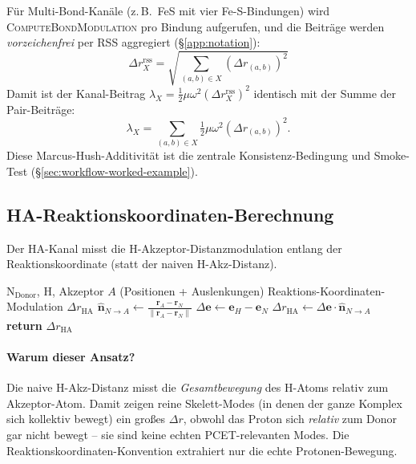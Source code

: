 \documentclass[11pt,a4paper,twoside]{article}
\theoremstyle{remark}
\begin{document}
F\"ur Multi-Bond-Kan\"ale (z.\,B.\ FeS mit vier Fe-S-Bindungen) wird
\textsc{ComputeBondModulation} pro Bindung aufgerufen, und die
Beitr\"age werden \emph{vorzeichenfrei} per RSS aggregiert
(\S\ref{app:notation}):
\begin{equation}
  \Delta r_X^\text{rss} = \sqrt{\sum_{(a,b) \in X} (\Delta r_{(a,b)})^2}
\end{equation}
Damit ist der Kanal-Beitrag $\lambda_X = \tfrac{1}{2}\mu\omega^2
(\Delta r_X^\text{rss})^2$ identisch mit der Summe der
Pair-Beitr\"age:
\begin{equation}
  \lambda_X = \sum_{(a,b) \in X} \tfrac{1}{2}\mu\omega^2 (\Delta r_{(a,b)})^2.
  \label{eq:reorg-additivity}
\end{equation}
Diese Marcus-Hush-Additivit\"at ist die zentrale Konsistenz-Bedingung
und Smoke-Test (\S\ref{sec:workflow-worked-example}).

\subsection{HA-Reaktionskoordinaten-Berechnung}
\label{app:pseudo-ha}

Der HA-Kanal misst die H-Akzeptor-Distanzmodulation entlang der
Reaktionskoordinate (statt der naiven H-Akz-Distanz).

\begin{algorithm}[H]
\caption{\textsc{ComputeHAReactionCoord}}
\begin{algorithmic}[1]
\Require N$_\text{Donor}$, H, Akzeptor $A$ (Positionen + Auslenkungen)
\Ensure Reaktions-Koordinaten-Modulation $\Delta r_\text{HA}$
\State $\hat{\mathbf{n}}_{N\to A} \gets
       \frac{\mathbf{r}_A - \mathbf{r}_N}
            {\|\mathbf{r}_A - \mathbf{r}_N\|}$
\State $\Delta\mathbf{e} \gets \mathbf{e}_H - \mathbf{e}_N$
\State $\Delta r_\text{HA} \gets \Delta\mathbf{e} \cdot
       \hat{\mathbf{n}}_{N\to A}$
\State \textbf{return} $\Delta r_\text{HA}$
\end{algorithmic}
\end{algorithm}

\paragraph{Warum dieser Ansatz?}
Die naive H-Akz-Distanz misst die \emph{Gesamtbewegung} des H-Atoms
relativ zum Akzeptor-Atom. Damit zeigen reine Skelett-Modes (in
denen der ganze Komplex sich kollektiv bewegt) ein gro{\ss}es
$\Delta r$, obwohl das Proton sich \emph{relativ} zum Donor gar nicht
bewegt -- sie sind keine echten PCET-relevanten Modes. Die
Reaktionskoordinaten-Konvention extrahiert nur die echte
Protonen-Bewegung.
\end{document}
